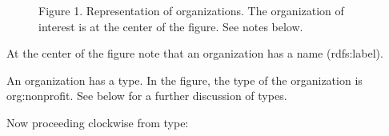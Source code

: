 \documentclass[letterpaper,10pt,english]{sphinxmanual}
\begin{document}
\begin{figure}[htbp]
\centering
\capstart

\noindent{}
\caption{Figure 1.  Representation of organizations.  The organization of interest is at the
center of the figure.  See notes below.}\label{\detokenize{organizations:id5}}\label{\detokenize{organizations:figure-1}}\end{figure}

\sphinxAtStartPar
At the center of the figure note that an organization has a name (rdfs:label).

\sphinxAtStartPar
An organization has a type.  In the figure, the type of the organization is
org:nonprofit.  See below for a further discussion of types.

\sphinxAtStartPar
Now proceeding clockwise from type:
\end{document}
